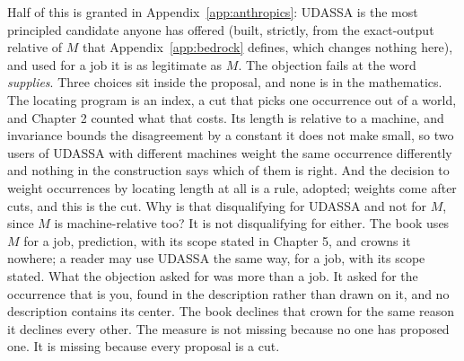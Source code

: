 Half of this is granted in Appendix~\ref{app:anthropics}: UDASSA is the most principled candidate anyone has offered (built, strictly, from the exact-output relative of $M$ that Appendix~\ref{app:bedrock} defines, which changes nothing here), and used for a job it is as legitimate as $M$. The objection fails at the word \emph{supplies}. Three choices sit inside the proposal, and none is in the mathematics. The locating program is an index, a cut that picks one occurrence out of a world, and Chapter 2 counted what that costs. Its length is relative to a machine, and invariance bounds the disagreement by a constant it does not make small, so two users of UDASSA with different machines weight the same occurrence differently and nothing in the construction says which of them is right. And the decision to weight occurrences by locating length at all is a rule, adopted; weights come after cuts, and this is the cut. Why is that disqualifying for UDASSA and not for $M$, since $M$ is machine-relative too? It is not disqualifying for either. The book uses $M$ for a job, prediction, with its scope stated in Chapter 5, and crowns it nowhere; a reader may use UDASSA the same way, for a job, with its scope stated. What the objection asked for was more than a job. It asked for the occurrence that is you, found in the description rather than drawn on it, and no description contains its center. The book declines that crown for the same reason it declines every other. The measure is not missing because no one has proposed one. It is missing because every proposal is a cut.
